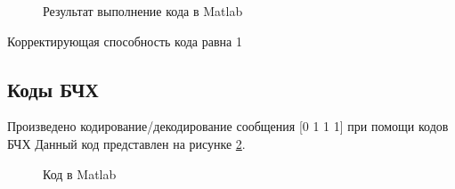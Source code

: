 \documentclass[a4paper,14pt]{extarticle}
\begin{document}
\begin{figure}[H]
\caption{Результат выполнение кода в Matlab}
\label{8}
\end{figure}

Корректирующая способность кода равна 1

\subsection{Коды БЧХ}

Произведено кодирование/декодирование сообщения [0 1 1 1] при помощи кодов БЧХ
Данный код представлен на рисунке \ref{9}.

\begin{figure}[H]
\caption{Код в Matlab}
\label{9}
\end{figure}
\end{document}
